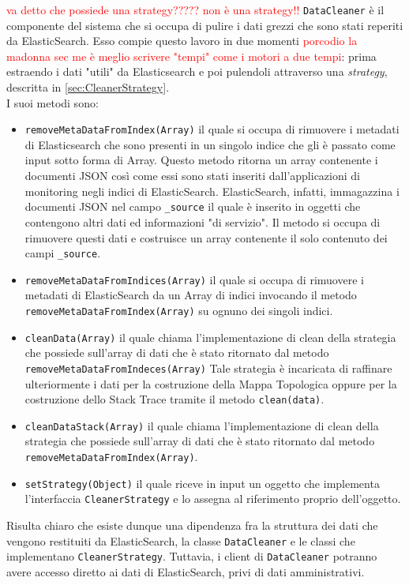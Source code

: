 \label{sec:DataCleaner}
\textcolor{red}{va detto che possiede una strategy????? non è una strategy!!}
\texttt{DataCleaner} è il componente del sistema che si occupa di pulire i dati grezzi che sono stati reperiti da ElasticSearch. Esso compie questo lavoro in due momenti \textcolor{red}{porcodio la madonna sec me è meglio scrivere "tempi" come i motori a due tempi}: prima estraendo i dati "utili" da Elasticsearch e poi pulendoli attraverso una \emph{strategy}, descritta in \ref{sec:CleanerStrategy}.\\
I suoi metodi sono:
\begin{itemize}
	\item \texttt{removeMetaDataFromIndex(Array)} il quale si occupa di rimuovere i metadati di Elasticsearch che sono presenti in un singolo indice che gli è passato come input sotto forma di Array. Questo metodo ritorna un array contenente i documenti JSON così come essi sono stati inseriti dall'applicazioni di monitoring negli indici di ElasticSearch. ElasticSearch, infatti, immagazzina i documenti JSON nel campo \texttt{\_source} il quale è inserito in oggetti che contengono altri dati ed informazioni "di servizio". Il metodo si occupa di rimuovere questi dati e costruisce un array contenente il solo contenuto dei campi \texttt{\_source}.
	\item \texttt{removeMetaDataFromIndices(Array)} il quale si occupa di rimuovere i metadati di ElasticSearch da un Array di indici invocando il metodo \texttt{removeMetaDataFromIndex(Array)} su ognuno dei singoli indici.
	\item \texttt{cleanData(Array)} il quale chiama l'implementazione di clean della strategia che possiede sull'array di dati che è stato ritornato dal metodo \texttt{removeMetaDataFromIndeces(Array)}  Tale strategia è incaricata di raffinare ulteriormente i dati per la costruzione della Mappa Topologica oppure per la costruzione dello Stack Trace tramite il metodo \texttt{clean(data)}.
	\item \texttt{cleanDataStack(Array)} il quale chiama l'implementazione di clean della strategia che possiede sull'array di dati che è stato ritornato dal metodo \texttt{removeMetaDataFromIndex(Array)}.
	\item \texttt{setStrategy(Object)} il quale riceve in input un oggetto che implementa l'interfaccia \texttt{CleanerStrategy} e lo assegna al riferimento proprio dell'oggetto.
	
\end{itemize}
Risulta chiaro che esiste dunque una dipendenza fra la struttura dei dati che vengono restituiti da ElasticSearch, la classe \texttt{DataCleaner} e le classi che implementano \texttt{CleanerStrategy}. Tuttavia, i client di \texttt{DataCleaner} potranno avere accesso diretto ai dati di ElasticSearch, privi di dati amministrativi.

